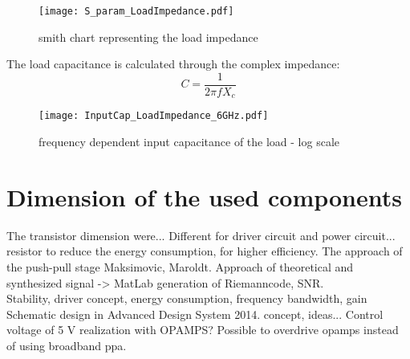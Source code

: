  \begin{figure}[ht]
	\centering
  \texttt{[image: S\_param\_LoadImpedance.pdf]}
	\caption{smith chart representing the load impedance}
	\label{fig:smith_load_impedance}
\end{figure}

The load capacitance is calculated through the complex impedance:
\begin{equation}
C = \frac{1}{2 \pi f X_c}
\end{equation}

 \begin{figure}[ht]
	\centering
  \texttt{[image: InputCap\_LoadImpedance\_6GHz.pdf]}
	\caption{frequency dependent input capacitance of the load - log scale}
	\label{fig:smith_load_impedance_inC}
\end{figure}

\section{Dimension of the used components}
The transistor dimension were... Different for driver circuit and power circuit... resistor to reduce the energy  consumption, for higher efficiency.
The approach of the push-pull stage Maksimovic, Maroldt.
Approach of theoretical and synthesized signal -> MatLab generation of Riemanncode, SNR.\\ Stability, driver concept, energy consumption, frequency bandwidth, gain
Schematic design in Advanced Design System 2014. concept, ideas... 
Control voltage of 5 V realization with OPAMPS? Possible to overdrive opamps instead of using broadband ppa. 

